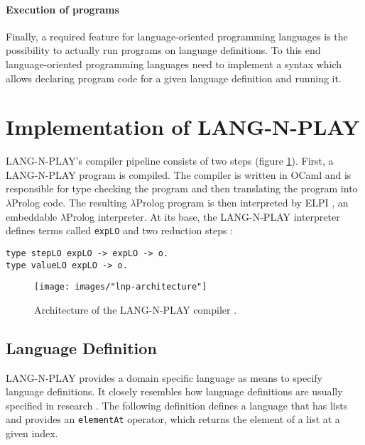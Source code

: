 \paragraph{Execution of programs}
Finally, a required feature for language-oriented programming languages is the possibility to actually run programs on language definitions. To this end language-oriented programming languages need to implement a syntax which allows declaring program code for a given language definition and running it.


\section{Implementation of LANG-N-PLAY}
\label{lang-n-play} LANG-N-PLAY's compiler pipeline consists of two steps (figure \ref{fig:lnp-architecture}). First, a LANG-N-PLAY program is compiled. The compiler is written in OCaml and is responsible for type checking the program and then translating the program into $\lambda$Prolog code. The resulting $\lambda$Prolog program is then interpreted by ELPI \cite{noauthor_elpi_2022}, an embeddable $\lambda$Prolog interpreter. At its base, the LANG-N-PLAY interpreter defines terms called \lstinline|expLO| and two reduction steps \cite{cimini_effectiveness_2020}:

\begin{lstlisting}
type stepLO expLO -> expLO -> o.
type valueLO expLO -> o.
\end{lstlisting}

\begin{figure}
  \centering
  \texttt{[image: images/"lnp-architecture"]}
  \caption{Architecture of the LANG-N-PLAY compiler \cite{cimini_effectiveness_2020}.}
  \label{fig:lnp-architecture}
\end{figure}

\subsection{Language Definition}
LANG-N-PLAY provides a domain specific language as means to specify language definitions. It closely resembles how language definitions are usually specified in research \cite{cimini_effectiveness_2020}. The following definition defines a language that has lists and provides an \lstinline{elementAt} operator, which returns the element of a list at a given index.

